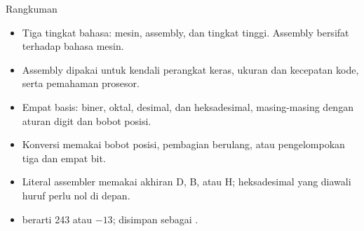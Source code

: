 \documentclass[aspectratio=169,11pt]{beamer}
\begin{document}
\begin{frame}{Rangkuman}
\small
\begin{itemize}
    \item Tiga tingkat bahasa: mesin, assembly, dan tingkat tinggi.
          Assembly bersifat  terhadap bahasa mesin.

    \vspace{0.15em}
    \item Assembly dipakai untuk kendali perangkat keras, ukuran dan
          kecepatan kode, serta pemahaman prosesor.

    \vspace{0.15em}
    \item Empat basis: biner, oktal, desimal, dan heksadesimal,
          masing-masing dengan aturan digit dan bobot posisi.

    \vspace{0.15em}
    \item Konversi memakai bobot posisi, pembagian berulang, atau
          pengelompokan tiga dan empat bit.

    \vspace{0.15em}
    \item Literal assembler memakai akhiran D, B, atau H; heksadesimal
          yang diawali huruf perlu nol di depan.

    \vspace{0.15em}
    \item {} berarti 243 atau $-13$;  disimpan sebagai
          .
\end{itemize}
\end{frame}
\end{document}
